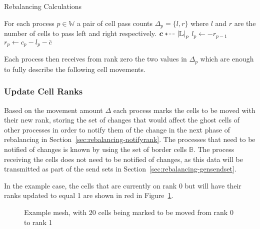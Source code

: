 \documentclass[twoside]{IIBproject}
\newcommand{\vect} [1] {\bm{#1}}
\newcommand{\dla}{\dashleftarrow}
\numberwithin{figure}{section}
\begin{document}
            \begin{algorithm}[H]
                \caption{Rebalancing Calculations}
                \label{alg:rebalance-calculatepassing}

                \begin{algorithmic}
                    \Ensure For each process $p \in \mathbb{W}$ a pair of cell pass counts $\Delta_p = \{l,r\}$ where $l$ and $r$ are the number of cells to pass left and right respectively.
                    \Statex
                    \Gather $\vect{c} \dla \abs{\mathbb{L}}_p $
                        \State $l_p \gets -r_{p-1}$
                        \State $r_p \gets c_p - l_p - \bar{c}$
                    \EndFor
                \end{algorithmic}
            \end{algorithm}

            Each process then receives from rank zero the two values in $\Delta_p$ which are enough to fully describe the following cell movements.



        \subsubsection{Update Cell Ranks} %
            \label{sec:rebalancing-updatecellranks}

            Based on the movement amount $\Delta$ each process marks the cells to be moved with their new rank, storing the set of changes that would affect the ghost cells of other processes in order to notify them of the change in the next phase of rebalancing in Section~\ref{sec:rebalancing-notifyrank}. The processes that need to be notified of changes is known by using the set of border cells $\mathbb{B}$. The process receiving the cells does not need to be notified of changes, as this data will be transmitted as part of the send sets in Section~\ref{sec:rebalancing-gensendset}.

            In the example case, the cells that are currently on rank 0 but will have their ranks updated to equal 1 are shown in red in Figure~\ref{fig:rebalance-ranks}.

            \begin{figure}[H]
                
                \caption{Example mesh, with 20 cells being marked to be moved from rank 0 to rank 1}
                \label{fig:rebalance-ranks}
            \end{figure}
\end{document}
